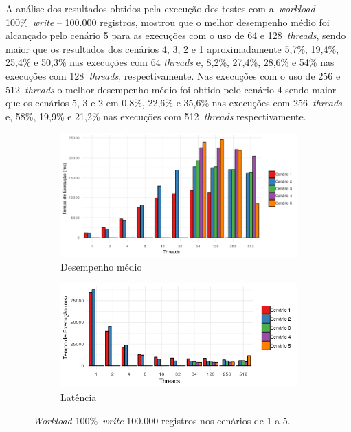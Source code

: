\documentclass[12pt]{article}
\begin{document}
A análise dos resultados obtidos pela execução dos testes com a~\emph{workload} 100\%~\emph{write} -- 100.000 registros, mostrou que o melhor desempenho médio foi alcançado pelo cenário 5 para as execuções com o uso de 64 e 128~\emph{threads}, sendo maior que os resultados dos cenários 4, 3, 2 e 1 aproximadamente 5,7\%, 19,4\%, 25,4\% e 50,3\% nas execuções com 64 \emph{threads} e, 8,2\%, 27,4\%, 28,6\% e 54\% nas execuções com 128~\emph{threads}, respectivamente. 
Nas execuções com o uso de 256 e 512~\emph{threads} o melhor desempenho médio foi obtido pelo cenário 4 sendo maior que os cenários 5, 3 e 2 em 0,8\%, 22,6\% e 35,6\% nas execuções com 256~\emph{threads} e, 58\%, 19,9\% e 21,2\% nas execuções com 512~\emph{threads} respectivamente.

\begin{figure}
    \centering
    \begin{subfigure}[b]{0.49\textwidth}
        \centering
        \includegraphics[width=\textwidth]{images/figura11}
        \caption{Desempenho médio}
        \label{figura11}
    \end{subfigure}
        \hfill
    \begin{subfigure}[b]{0.49\textwidth}  
        \centering 
        \includegraphics[width=\textwidth]{images/figura12}
        \caption{Latência}%
        \label{figura12}
    \end{subfigure}
    \caption{\emph{Workload} 100\%~\emph{write} 100.000 registros nos cenários de 1 a 5.}
\end{figure}
\end{document}
